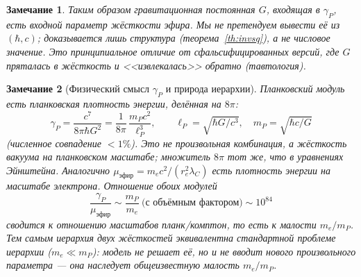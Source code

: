 \documentclass[12pt,a4paper]{article}
\newtheorem{remark}{Замечание}
\begin{document}
\begin{remark}
Таким образом гравитационная постоянная $G$, входящая в $\gamma_P$, есть
\emph{входной} параметр жёсткости эфира. Мы не претендуем вывести её из $(\hbar,c)$;
доказывается лишь \emph{структура} (теорема~\ref{th:invsq}), а не числовое значение.
Это принципиальное отличие от сфальсифицированных версий, где $G$ пряталась в
жёсткость и <<извлекалась>> обратно (тавтология).
\end{remark}

\begin{remark}[Физический смысл $\gamma_P$ и природа иерархии]
Планковский модуль есть планковская \emph{плотность энергии}, делённая на $8\pi$:
\begin{equation}
\gamma_P=\frac{c^7}{8\pi\hbar G^2}=\frac{1}{8\pi}\,\frac{m_P c^2}{\ell_P^3},
\qquad \ell_P=\sqrt{\hbar G/c^3},\quad m_P=\sqrt{\hbar c/G}
\end{equation}
(численное совпадение $<1\%$). Это не произвольная комбинация, а жёсткость
вакуума на планковском масштабе; множитель $8\pi$ тот же, что в уравнениях
Эйнштейна. Аналогично $\mu_{\text{эфир}}=m_e c^2/(r_e^2\lambda_C)$ есть плотность
энергии на масштабе электрона. Отношение обоих модулей
\begin{equation}
\frac{\gamma_P}{\mu_{\text{эфир}}}\sim\frac{m_P}{m_e}\ \text{(с объёмным фактором)}\sim10^{84}
\end{equation}
сводится к отношению масштабов планк/комптон, то есть к малости $m_e/m_P$. Тем
самым иерархия двух жёсткостей \emph{эквивалентна} стандартной \emph{проблеме
иерархии} ($m_e\ll m_P$): модель не решает её, но и не вводит нового произвольного
параметра --- она наследует общеизвестную малость $m_e/m_P$.
\end{remark}
\end{document}
